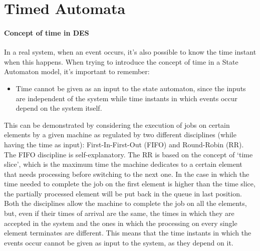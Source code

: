 \documentclass[12pt,a4paper]{article}
\begin{document}
\section{Timed Automata}
\paragraph{Concept of time in DES} In a real system, when an event occurs, it’s also possible to know the time instant when this happens. When trying to introduce the concept of time in a State Automaton model, it’s important to remember:
\begin{itemize}
\item Time cannot be given as an input to the state automaton, since the inputs are independent of the system while time instants in which events occur depend on the system itself. 
\end{itemize}
This can be demonstrated by considering the execution of jobs on certain elements by a given machine as regulated by two different disciplines (while having the time as input): First-In-First-Out (FIFO) and Round-Robin (RR). The FIFO discipline is self-explanatory. The RR is based on the concept of `time slice’, which is the maximum time the machine dedicates to a certain element that needs processing before switching to the next one. In the case in which the time needed to complete the job on the first element is higher than the time slice, the partially processed element will be put back in the queue in last position.
Both the disciplines allow the machine to complete the job on all the elements, but, even if their times of arrival are the same, the times in which they are accepted in the system and the ones in which the processing on every single element terminates are different. This means that the time instants in which the events occur cannot be given as input to the system, as they depend on it.
\end{document}
